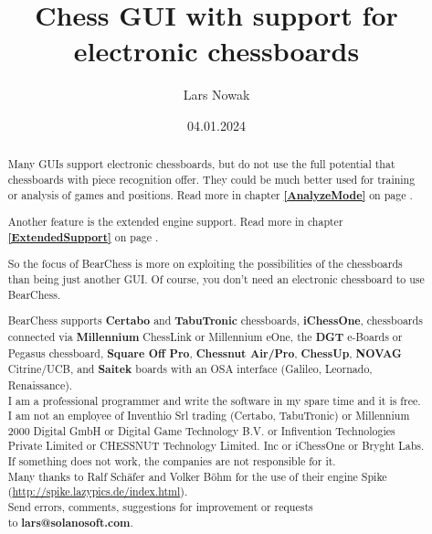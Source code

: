 \documentclass[11pt,a4paper]{article}
\title{Chess GUI with support for electronic chessboards}
\author{Lars Nowak}
\date{04.01.2024}
\begin{document}
\maketitle

\begin{abstract}

Many GUIs support electronic chessboards, but do not use the full potential that chessboards with piece recognition offer. They could be much better used for training or analysis of games and positions. Read more in chapter \textbf{\ref{AnalyzeMode}  } on page \pageref{AnalyzeMode}.

Another feature is the extended engine support. Read more in chapter \textbf{\ref{ExtendedSupport}  } on page \pageref{ExtendedSupport}.

So the focus of BearChess is more on exploiting the possibilities of the chessboards than being just another GUI. Of course, you don't need an electronic chessboard to use BearChess.

BearChess supports \textbf{Certabo} and \textbf{TabuTronic} chessboards, \textbf{iChessOne}, chessboards connected via \textbf{Millennium} ChessLink or Millennium eOne, the \textbf{DGT} e-Boards or Pegasus chessboard, \textbf{Square Off Pro}, \textbf{Chessnut Air/Pro}, \textbf{ChessUp}, \textbf{NOVAG} Citrine/UCB, and \textbf{Saitek} boards with an OSA interface (Galileo, Leornado, Renaissance).\\

I am a professional programmer and write the software in my spare time and it is free. I am not an employee of Inventhio Srl trading (Certabo, TabuTronic) or Millennium 2000 Digital GmbH or Digital Game Technology B.V. or Infivention Technologies Private Limited or CHESSNUT Technology Limited. Inc or iChessOne or Bryght Labs. If something does not work, the companies are not responsible for it.\\

Many thanks to Ralf Schäfer and Volker Böhm for the use of their engine Spike (\url{http://spike.lazypics.de/index.html}).\\

Send errors, comments, suggestions for improvement or requests\\to \textbf{lars@solanosoft.com}.

\end{abstract}

\newpage
\tableofcontents
\newpage
\end{document}
